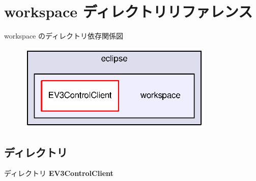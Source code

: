 \section{workspace ディレクトリリファレンス}
\label{dir_bb2be7f70403c819abfff8b86e9072f9}
workspace のディレクトリ依存関係図
\nopagebreak
\begin{figure}[H]
\begin{center}
\leavevmode
\includegraphics[width=265pt]{dir_bb2be7f70403c819abfff8b86e9072f9_dep}
\end{center}
\end{figure}
\subsection*{ディレクトリ}
\begin{DoxyCompactItemize}
\item 
ディレクトリ {\bf E\-V3\-Control\-Client}
\end{DoxyCompactItemize}

